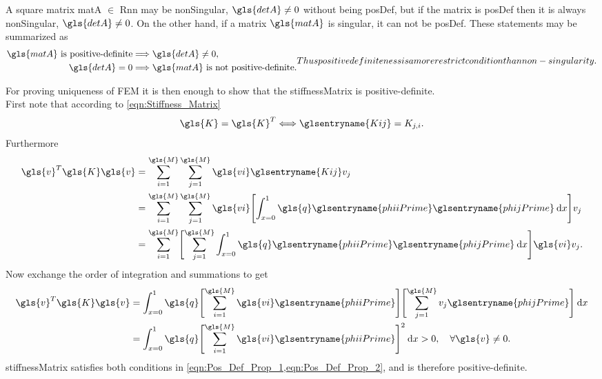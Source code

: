 \begin{remark}
	A square matrix \gls{matA} $\in$ \gls{Rnn} may be \gls{nonSingular}, $\gls{detA} \neq 0$ without being \gls{posDef}, but
	if the matrix is \gls{posDef} then it is always \gls{nonSingular}, $\gls{detA} \neq 0$. On the other hand, if a matrix
	$\gls{matA}$ is \gls{singular}, it can not be \gls{posDef}. These statements may be summarized as
	\begin{subequations}
		\begin{align} 
			\gls{matA} \text{ is positive-definite} & \Longrightarrow \gls{detA} \neq 0, \\
			\gls{detA} = 0 & \Longrightarrow \gls{matA} \text{ is not positive-definite}.
		\end{align}
		Thus positive definiteness is a more restrict condition than non-singularity.
	\end{subequations}
\end{remark}

For proving uniqueness of \gls{FEM} it is then enough to show that the \gls{stiffnessMatrix} is positive-definite.\\
First note that according to \cref{eqn:Stiffness_Matrix}
\begin{equation}
	\gls{K} = \gls{K}^T \Longleftrightarrow \glsentryname{Kij} = K_{j,i}.
\end{equation}
Furthermore
\begin{equation}
	\begin{aligned}
		\gls{v}^{T} \gls{K} \gls{v}  &= \sum \limits_{i = 1}^{\gls{M}} \sum \limits_{j = 1}^{\gls{M}}
			\gls{vi} \glsentryname{Kij} v_j \\
		&= \sum \limits_{i = 1}^{\gls{M}} \sum \limits_{j = 1}^{\gls{M}} \gls{vi} \Biggl[ \int_{x = 0}^{1}
			\gls{q} \glsentryname{phiiPrime} \glsentryname{phijPrime} \dd x \Biggr] v_j \\
		&= \sum \limits_{i = 1}^{\gls{M}} \Biggl[ \sum \limits_{j = 1}^{\gls{M}} \int_{x = 0}^{1}
		\gls{q} \glsentryname{phiiPrime} \glsentryname{phijPrime} \dd x \Biggr] \gls{vi} v_j.
	\end{aligned}
\end{equation}
Now exchange the order of integration and summations to get
\begin{equation} \label{eqn:Pos_Def_Simplified}
	\begin{aligned}
		\gls{v}^{T} \gls{K} \gls{v}  &= \int_{x = 0}^{1} \gls{q} \Biggl[ \sum \limits_{i = 1}^{\gls{M}} \gls{vi} \glsentryname{phiiPrime} \Biggr]
		\Biggl[ \sum \limits_{j = 1}^{\gls{M}} v_j \glsentryname{phijPrime} \Biggr] \dd x \\
		&= \int_{x = 0}^{1} \gls{q} \Biggl[ \sum \limits_{i = 1}^{\gls{M}} \gls{vi} \glsentryname{phiiPrime} \Biggr]^{2} \dd x > 
		0, \quad \forall \gls{v} \neq 0.
	\end{aligned}
\end{equation}
\Gls{stiffnessMatrix} satisfies both conditions in \cref{eqn:Pos_Def_Prop_1,eqn:Pos_Def_Prop_2}, and is therefore positive-definite.
%
